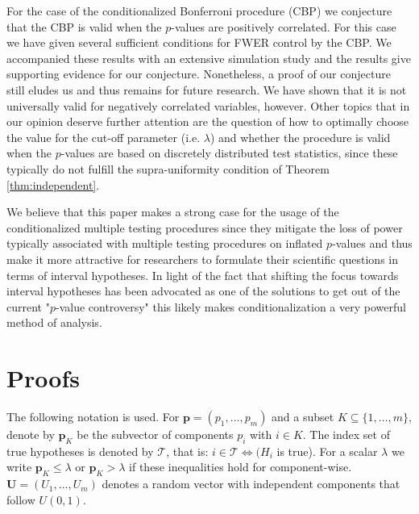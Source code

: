 \documentclass {imsart}
\newcommand{\SUD}{$U(0,1)$\xspace}
\def\mbf#1{\boldsymbol{#1}}                %
\begin{document}
For the case of the conditionalized Bonferroni procedure (CBP) we conjecture that the CBP is valid when the $p$-values are positively correlated. For this case we have given several sufficient conditions for FWER control by the CBP. We accompanied these results with an extensive simulation study and the results give supporting evidence for our conjecture. Nonetheless, a proof of our conjecture still eludes us and thus remains for future research. We have shown that it is not universally valid for negatively correlated variables, however. Other topics that in our opinion deserve further attention are the question of how to optimally choose the value for the cut-off parameter (i.e. $\lambda$) and whether the procedure is valid when the $p$-values are based on discretely distributed test statistics, since these typically do not fulfill the supra-uniformity condition of Theorem \ref{thm:independent}.

We believe that this paper makes a strong case for the usage of the conditionalized multiple testing procedures since they mitigate the loss of power typically associated with multiple testing procedures on inflated $p$-values and thus make it more attractive for researchers to formulate their scientific questions in terms of interval hypotheses. In light of the fact that shifting the focus towards interval hypotheses has been advocated as one of the solutions to get out of the current "$p$-value controversy" \citep{Wellek2017} this likely makes conditionalization a very powerful method of analysis.




\appendix
\section{Proofs}

The following notation is used. For $\mbf{p}=({p_1},\ldots,{p_m})$ and a subset $K \subseteq \{ 1,\ldots,m\} $, denote by $\mbf{p}_{\!K}$ be the subvector of components ${p_i}$ with $i\in{}K$. The index set of true hypotheses is denoted by $\mathcal{T}$, that is: $i \in \mathcal{T} \Leftrightarrow ({H_i}$ is true). For a scalar $\lambda $ we write $\mbf{p}_{\!K}\leq\lambda $ or $\mbf{p}_{\!K}>\lambda $ if these inequalities hold for component-wise. ${\mbf{U}}=({U_1},\ldots,{U_m})$ denotes a random vector with independent components that follow \SUD.
\end{document}
